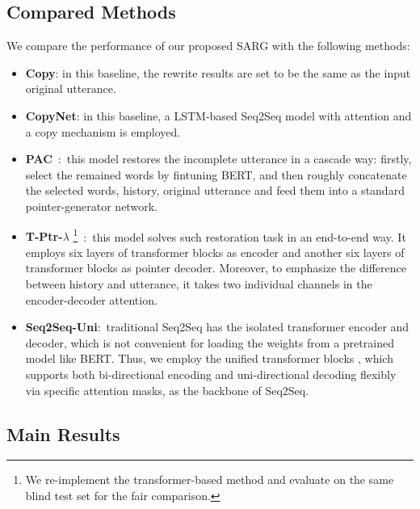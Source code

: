 \subsection{Compared Methods}
We compare the performance of our proposed SARG with the following methods:
\begin{itemize}
	\item \textbf{Copy}: in this baseline, the rewrite results are set to be the same as the input original utterance.
	
	\item \textbf{CopyNet}: in this baseline, a LSTM-based Seq2Seq model with attention and a copy mechanism is employed.
	
	\item \textbf{PAC}\ \cite{pan2019improving}:\ this model restores the incomplete utterance in a cascade way: firstly, select the remained words by fintuning BERT, and then roughly concatenate the selected words, history, original utterance and feed them into a standard pointer-generator network.
	
	\item \textbf{T-Ptr-$\lambda$} \footnote{We re-implement the transformer-based method and evaluate on the same blind test set for the fair comparison.}\ \cite{su2019improving}:\ this model solves such restoration task in an end-to-end way. It employs six layers of transformer blocks as encoder and another six layers of transformer blocks as pointer decoder. Moreover, to emphasize the difference between history and utterance, it takes two individual channels in the encoder-decoder attention.
	
	\item \textbf{Seq2Seq-Uni}:\ traditional Seq2Seq has the isolated transformer encoder and decoder, which is not convenient for loading the weights from a pretrained model like BERT. Thus, we employ the unified transformer blocks \cite{dong2019unified}, which supports both bi-directional encoding and uni-directional decoding flexibly via specific attention masks, as the backbone of Seq2Seq. 
\end{itemize}

\subsection{Main Results}

